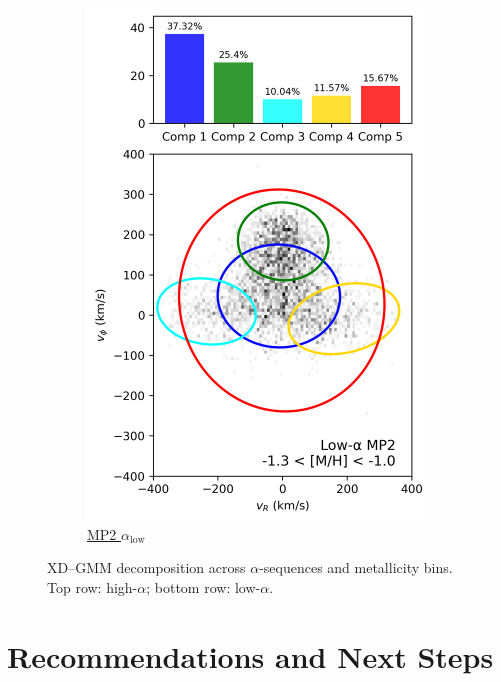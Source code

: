 \documentclass[a4paper,10pt]{article}
\begin{document}
\begin{multicols}{2}
\begin{figure}[H]
\begin{subfigure}[t]{0.24\linewidth}
    \includegraphics[width=\linewidth]{../figures/gmm_mp2_low_alpha_k6.png}
    \caption{\href{https://raw.githack.com/raunaq-rai/Disentangling-the-Milky-Way-using-GMM/main/figures/MP2\_low\_\_\_\_-1.3\%5BM\_H\%5D-1.0.html}{MP2 $\alpha_{\mathrm{low}}$}}
    \label{fig:low_mp2}
  \end{subfigure}


  \caption{XD–GMM decomposition across $\alpha$-sequences and metallicity bins. Top row: high-$\alpha$; bottom row: low-$\alpha$.}
  \label{fig:gmm_alpha_bins}
\end{figure}



\section*{Recommendations and Next Steps}


\end{multicols}
\end{document}
